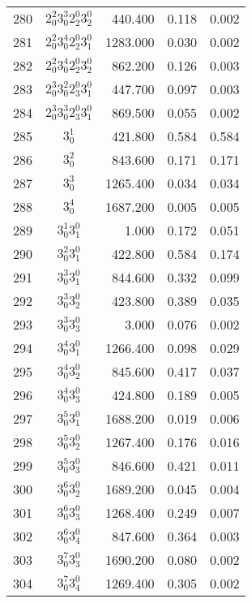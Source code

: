 \begin{table}
\begin{tabular}{rcrrr}
280&$2_0^2 3_0^3 2_2^0 3_2^0$& 440.400& 0.118& 0.002\\
281&$2_0^2 3_0^4 2_2^0 3_1^0$& 1283.000& 0.030& 0.002\\
282&$2_0^2 3_0^4 2_2^0 3_2^0$& 862.200& 0.126& 0.003\\
283&$2_0^3 3_0^2 2_3^0 3_1^0$& 447.700& 0.097& 0.003\\
284&$2_0^3 3_0^3 2_3^0 3_1^0$& 869.500& 0.055& 0.002\\
285&$3_0^1$& 421.800& 0.584& 0.584\\
286&$3_0^2$& 843.600& 0.171& 0.171\\
287&$3_0^3$& 1265.400& 0.034& 0.034\\
288&$3_0^4$& 1687.200& 0.005& 0.005\\
289&$3_0^1 3_1^0$& 1.000& 0.172& 0.051\\
290&$3_0^2 3_1^0$& 422.800& 0.584& 0.174\\
291&$3_0^3 3_1^0$& 844.600& 0.332& 0.099\\
292&$3_0^3 3_2^0$& 423.800& 0.389& 0.035\\
293&$3_0^3 3_3^0$& 3.000& 0.076& 0.002\\
294&$3_0^4 3_1^0$& 1266.400& 0.098& 0.029\\
295&$3_0^4 3_2^0$& 845.600& 0.417& 0.037\\
296&$3_0^4 3_3^0$& 424.800& 0.189& 0.005\\
297&$3_0^5 3_1^0$& 1688.200& 0.019& 0.006\\
298&$3_0^5 3_2^0$& 1267.400& 0.176& 0.016\\
299&$3_0^5 3_3^0$& 846.600& 0.421& 0.011\\
300&$3_0^6 3_2^0$& 1689.200& 0.045& 0.004\\
301&$3_0^6 3_3^0$& 1268.400& 0.249& 0.007\\
302&$3_0^6 3_4^0$& 847.600& 0.364& 0.003\\
303&$3_0^7 3_3^0$& 1690.200& 0.080& 0.002\\
304&$3_0^7 3_4^0$& 1269.400& 0.305& 0.002\\
\end{tabular}
\end{table}

